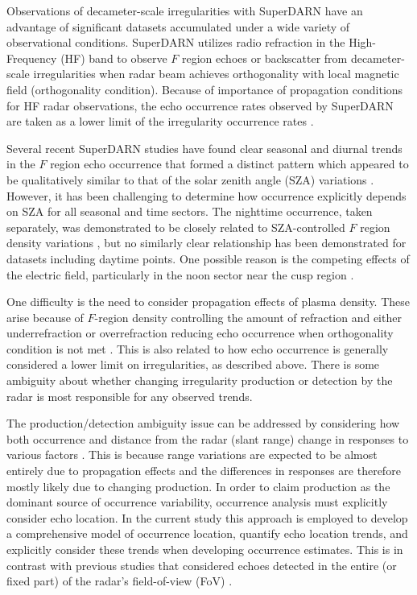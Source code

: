 Observations of decameter-scale irregularities with SuperDARN have an advantage of significant datasets accumulated under a wide variety of observational conditions. SuperDARN utilizes radio refraction in the High-Frequency (HF) band to observe \(F\) region echoes or backscatter from decameter-scale irregularities when radar beam achieves orthogonality with local magnetic field (orthogonality condition). Because of importance of propagation conditions for HF radar observations, the echo occurrence rates observed by SuperDARN are taken as a lower limit of the irregularity occurrence rates \citep{Chisham2007}.


Several recent SuperDARN studies have found clear seasonal and diurnal trends in the \(F\) region echo occurrence that formed a distinct pattern which appeared to be qualitatively similar to that of the solar zenith angle (SZA) variations \citep{Kane2012,Ghezelbash2014a,Ghezelbash2014b}. However, it has been challenging to determine how occurrence explicitly depends on SZA for all seasonal and time sectors. The nighttime occurrence, taken separately, was demonstrated to be closely related to SZA-controlled \(F\) region density  variations \citep{Kane2012}, but no similarly clear relationship has been demonstrated for datasets including daytime points.  One possible reason is the competing effects of the electric field, particularly in the noon sector near the cusp region \citep{Ghezelbash2014a,Ghezelbash2014b}.

One difficulty is the need to consider propagation effects of plasma density. These arise because of \(F\)-region density controlling the amount of refraction and either underrefraction or overrefraction reducing echo occurrence when orthogonality condition is not met \citep{Milan1997,Danskin2002}. This is also related to how echo occurrence is generally considered a lower limit on irregularities, as described above. There is some ambiguity about whether changing irregularity production or detection by the radar is most responsible for any observed trends.

The production/detection ambiguity issue can be addressed by considering how both occurrence and distance from the radar (slant range) change in responses to various factors \citep{Kane2012,Ghezelbash2014b}. This is because range variations are expected to be almost entirely due to propagation effects and the differences in responses are therefore mostly likely due to changing production. In order to claim production as the dominant source of occurrence variability, occurrence analysis must explicitly consider echo location. In the current study this approach is employed to develop a comprehensive model of occurrence location, quantify echo location trends, and explicitly consider these trends when developing occurrence estimates. This is in contrast with previous studies that considered echoes detected in the entire (or fixed part) of the radar's field-of-view (FoV) \citep[e.g.][]{Kumar2011,Kane2012}.

